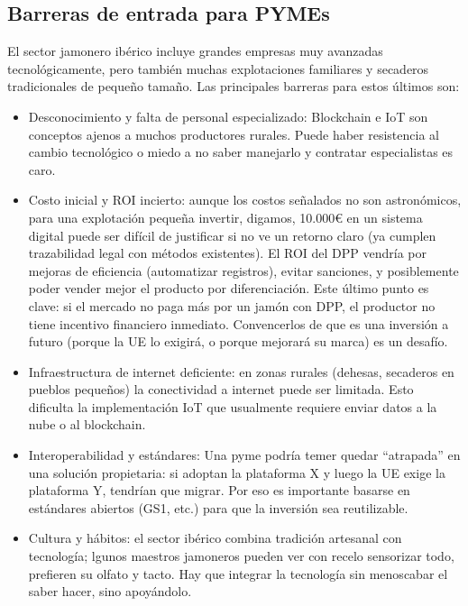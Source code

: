 \subsection{Barreras de entrada para PYMEs}
El sector jamonero ibérico incluye grandes empresas muy avanzadas tecnológicamente, pero también muchas explotaciones familiares y secaderos tradicionales de pequeño tamaño. Las principales barreras para estos últimos son:
\begin{itemize}
    \item Desconocimiento y falta de personal especializado: Blockchain e IoT son conceptos ajenos a muchos productores rurales. Puede haber resistencia al cambio tecnológico o miedo a no saber manejarlo y contratar especialistas es caro.
    \item Costo inicial y ROI incierto: aunque los costos señalados no son astronómicos, para una explotación pequeña invertir, digamos, 10.000€ en un sistema digital puede ser difícil de justificar si no ve un retorno claro (ya cumplen trazabilidad legal con métodos existentes). El ROI del DPP vendría por mejoras de eficiencia (automatizar registros), evitar sanciones, y posiblemente poder vender mejor el producto por diferenciación. Este último punto es clave: si el mercado no paga más por un jamón con DPP, el productor no tiene incentivo financiero inmediato. Convencerlos de que es una inversión a futuro (porque la UE lo exigirá, o porque mejorará su marca) es un desafío.
    \item Infraestructura de internet deficiente: en zonas rurales (dehesas, secaderos en pueblos pequeños) la conectividad a internet puede ser limitada. Esto dificulta la implementación IoT que usualmente requiere enviar datos a la nube o al blockchain.
    \item Interoperabilidad y estándares: Una pyme podría temer quedar “atrapada” en una solución propietaria: si adoptan la plataforma X y luego la UE exige la plataforma Y, tendrían que migrar. Por eso es importante basarse en estándares abiertos (GS1, etc.) para que la inversión sea reutilizable.
    \item Cultura y hábitos: el sector ibérico combina tradición artesanal con tecnología; lgunos maestros jamoneros pueden ver con recelo sensorizar todo, prefieren su olfato y tacto. Hay que integrar la tecnología sin menoscabar el saber hacer, sino apoyándolo.
\end{itemize}

